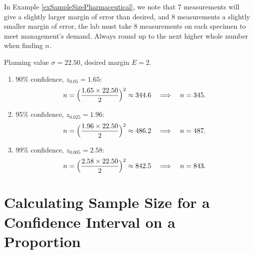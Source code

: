 In Example \ref{exSampleSizePharmaceutical}, we note that 7 measurements will give a slightly larger margin of error than desired, and 8 measurements a slightly smaller margin of error, the lab must take 8 measurements on each specimen to meet management’s demand. Always round up to the next higher whole number when finding \(n\).


\begin{example}

Planning value \(\sigma=22.50\), desired margin \(E=2\).

\begin{enumerate}
  \item 90\% confidence, \(z_{0.05}=1.65\):
    \[
    n = \Bigl(\frac{1.65 \times 22.50}{2}\Bigr)^2
      \approx 344.6
    \quad\Longrightarrow\quad n = 345.
    \]
  \item 95\% confidence, \(z_{0.025}=1.96\):
    \[
    n = \Bigl(\frac{1.96 \times 22.50}{2}\Bigr)^2
      \approx 486.2
    \quad\Longrightarrow\quad n = 487.
    \]
  \item 99\% confidence, \(z_{0.005}=2.58\):
    \[
    n = \Bigl(\frac{2.58 \times 22.50}{2}\Bigr)^2
      \approx 842.5
    \quad\Longrightarrow\quad n = 843.
    \]
\end{enumerate}


\end{example}

%
%


\section{Calculating Sample Size for a Confidence Interval on a Proportion}



